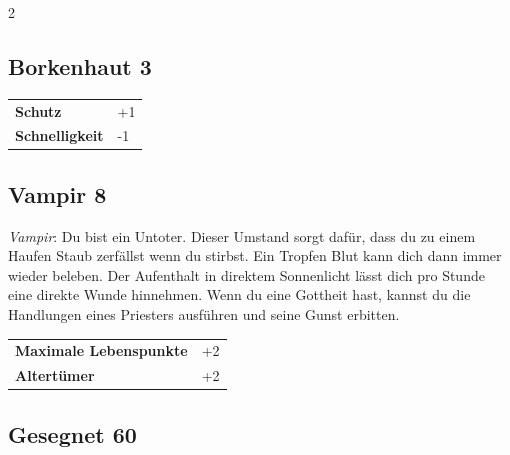 \begin{multicols}{2}
\begin{tcolorbox}
    \subsection*{Borkenhaut \hfill \small{3 }}
    \tcblower




\begin{tabular}{@{}ll@{}}
    \textbf{Schutz} & +1\\
    \textbf{Schnelligkeit} & -1\\
\end{tabular}


\end{tcolorbox}

\begin{tcolorbox}
    \subsection*{Vampir \hfill \small{8 }}
    \tcblower
\textit{Vampir}: Du bist ein Untoter. Dieser Umstand sorgt dafür, dass du zu einem Haufen Staub zerfällst wenn du stirbst. Ein Tropfen Blut kann dich dann immer wieder beleben. Der Aufenthalt in direktem Sonnenlicht lässt dich pro Stunde eine direkte Wunde hinnehmen. Wenn du eine Gottheit hast, kannst du die Handlungen eines Priesters ausführen und seine Gunst erbitten.


\vspace{3mm}

\begin{tabular}{@{}ll@{}}
    \textbf{Maximale Lebenspunkte} & +2\\
    \textbf{Altertümer} & +2\\
\end{tabular}


\end{tcolorbox}

\begin{tcolorbox}
    \subsection*{Gesegnet \hfill \small{60 }}
    \tcblower





\end{tcolorbox}
\end{multicols}
